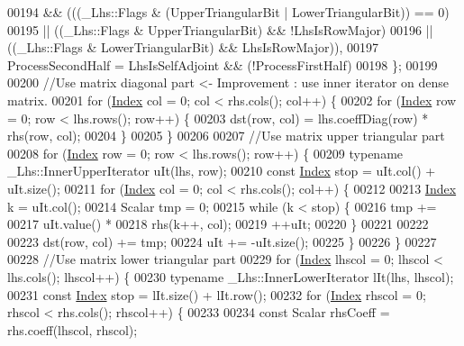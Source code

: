 \begin{DoxyCode}
00194         && (((\_Lhs::Flags & (UpperTriangularBit | LowerTriangularBit)) == 0)
00195         || ((\_Lhs::Flags & UpperTriangularBit) && !LhsIsRowMajor)
00196         || ((\_Lhs::Flags & LowerTriangularBit) && LhsIsRowMajor)),
00197         ProcessSecondHalf = LhsIsSelfAdjoint && (!ProcessFirstHalf)
00198     \};
00199 
00200     \textcolor{comment}{//Use matrix diagonal part <- Improvement : use inner iterator on dense matrix.}
00201     \textcolor{keywordflow}{for} (\hyperlink{namespace_eigen_a62e77e0933482dafde8fe197d9a2cfde}{Index} col = 0; col < rhs.cols(); col++) \{
00202         \textcolor{keywordflow}{for} (\hyperlink{namespace_eigen_a62e77e0933482dafde8fe197d9a2cfde}{Index} row = 0; row < lhs.rows(); row++) \{
00203             dst(row, col) = lhs.coeffDiag(row) * rhs(row, col);
00204         \}
00205     \}
00206 
00207     \textcolor{comment}{//Use matrix upper triangular part}
00208     \textcolor{keywordflow}{for} (\hyperlink{namespace_eigen_a62e77e0933482dafde8fe197d9a2cfde}{Index} row = 0; row < lhs.rows(); row++) \{
00209         \textcolor{keyword}{typename} \_Lhs::InnerUpperIterator uIt(lhs, row);
00210         \textcolor{keyword}{const} \hyperlink{namespace_eigen_a62e77e0933482dafde8fe197d9a2cfde}{Index} stop = uIt.col() + uIt.size();
00211         \textcolor{keywordflow}{for} (\hyperlink{namespace_eigen_a62e77e0933482dafde8fe197d9a2cfde}{Index} col = 0; col < rhs.cols(); col++) \{
00212 
00213             \hyperlink{namespace_eigen_a62e77e0933482dafde8fe197d9a2cfde}{Index} k = uIt.col();
00214             Scalar tmp = 0;
00215             \textcolor{keywordflow}{while} (k < stop) \{
00216                 tmp +=
00217                         uIt.value() *
00218                         rhs(k++, col);
00219                 ++uIt;
00220             \}
00221 
00222 
00223             dst(row, col) += tmp;
00224             uIt += -uIt.size();
00225         \}
00226     \}
00227 
00228     \textcolor{comment}{//Use matrix lower triangular part}
00229     \textcolor{keywordflow}{for} (\hyperlink{namespace_eigen_a62e77e0933482dafde8fe197d9a2cfde}{Index} lhscol = 0; lhscol < lhs.cols(); lhscol++) \{
00230         \textcolor{keyword}{typename} \_Lhs::InnerLowerIterator lIt(lhs, lhscol);
00231         \textcolor{keyword}{const} \hyperlink{namespace_eigen_a62e77e0933482dafde8fe197d9a2cfde}{Index} stop = lIt.size() + lIt.row();
00232         \textcolor{keywordflow}{for} (\hyperlink{namespace_eigen_a62e77e0933482dafde8fe197d9a2cfde}{Index} rhscol = 0; rhscol < rhs.cols(); rhscol++) \{
00233 
00234             \textcolor{keyword}{const} Scalar rhsCoeff = rhs.coeff(lhscol, rhscol);

\end{DoxyCode}
